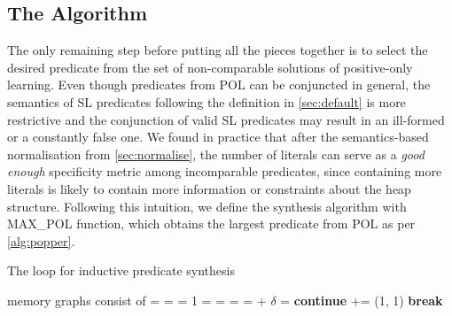 \subsection{The \tool Algorithm}
\label{sec:tool}

The only remaining step before putting all the pieces together is to
select the desired predicate from the set of non-comparable solutions
of positive-only learning. 
%
Even though predicates from POL can be conjuncted in general, the
semantics of SL predicates following the definition in
\autoref{sec:default} is more restrictive and the conjunction of valid
SL predicates may result in an ill-formed or a constantly false one. 
%
We found in practice that after the semantics-based normalisation from
\autoref{sec:normalise}, the number of literals can serve as a
\emph{good enough} specificity metric among incomparable predicates,
since containing more literals is likely to contain more information
or constraints about the heap structure. 
%
Following this intuition, we define the synthesis algorithm with
MAX\_POL function, which obtains the largest predicate from POL as per
\autoref{alg:popper}.

\begin{algorithm}[!t]
  \caption{The \tool loop for inductive predicate synthesis}
  \label{alg:sippy}
  \begin{algorithmic}[1]
  \small
  \Require memory graphs consist of 
      \State {} = 
      \State {} =  = 1
      \State {} =  
        \State {} = 
        \State {} = 
         
            \State {} =  + $\delta$
            \State {} = 
         
                \State \textbf{continue} 
            \EndIf
            \State {} += (1, 1)
        \Else
            \State \textbf{break} 
        \EndIf
      \EndFor
      \State \Return {}
  \EndProcedure
  \end{algorithmic}
\end{algorithm}



